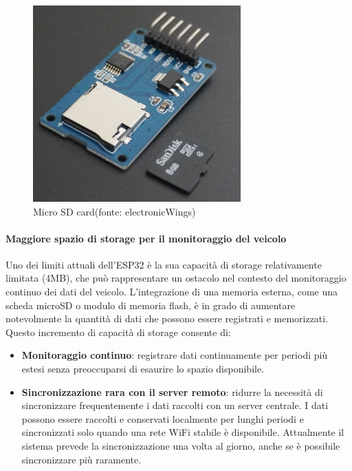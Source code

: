 \documentclass[12pt, a4paper, italian]{report}
\numberwithin{figure}{chapter}
\numberwithin{table}{chapter}
\begin{document}
\begin{figure}[h]
  \centering
  \includegraphics[width=8cm]{MicroSD.png}
  \caption{Micro SD card\protect\footnotemark (fonte: electronicWings)}
  \label{fig:MicroSD}
\end{figure}

\paragraph{Maggiore spazio di storage per il monitoraggio del veicolo} 
Uno dei limiti attuali dell'ESP32 è la sua capacità di storage relativamente limitata (4MB), che può rappresentare un ostacolo nel contesto del monitoraggio continuo dei dati del veicolo. L'integrazione di una memoria esterna, come una scheda microSD o modulo di memoria flash, è in grado di aumentare notevolmente la quantità di dati che possono essere registrati e memorizzati. Questo incremento di capacità di storage consente di:

\begin{itemize}
    \item \textbf{Monitoraggio continuo}: registrare dati continuamente per periodi più estesi senza preoccuparsi di esaurire lo spazio disponibile.
    \item \textbf{Sincronizzazione rara con il server remoto}: ridurre la necessità di sincronizzare frequentemente i dati raccolti con un server centrale. I dati possono essere raccolti e conservati localmente per lunghi periodi e sincronizzati solo quando una rete WiFi stabile è disponibile. Attualmente il sistema prevede la sincronizzazione una volta al giorno, anche se è possibile sincronizzare più raramente.
\end{itemize}
\end{document}
